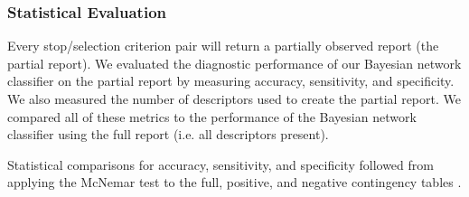 \subsubsection{Statistical Evaluation}
Every stop/selection criterion pair will return a partially observed report (the partial report).
We evaluated the diagnostic performance of our Bayesian network classifier on the partial report by measuring accuracy, sensitivity, and specificity.
We also measured the number of descriptors used to create the partial report.
We compared all of these metrics to the performance of the Bayesian network classifier using the full report (i.e. all descriptors present).

Statistical comparisons for accuracy, sensitivity, and specificity followed from applying the McNemar test to the full, positive, and negative contingency tables \cite{Trajman:2008dp,Kim:2014dk}.